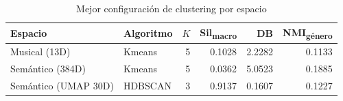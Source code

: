 \begin{table}[htbp]
  \centering
  \caption{Mejor configuración de clustering por espacio}
  \label{tab:clustering_best_configs}
  \begin{tabular}{llrrrr}
    \toprule
    Espacio & Algoritmo & $K$ & Sil\textsubscript{macro} & DB & NMI\textsubscript{género} \\
    \midrule
    Musical (13D) & Kmeans & 5 & 0.1028 & 2.2282 & 0.1133 \\
    Semántico (384D) & Kmeans & 5 & 0.0362 & 5.0523 & 0.1885 \\
    Semántico (UMAP 30D) & HDBSCAN & 3 & 0.9137 & 0.1607 & 0.1227 \\
    \bottomrule
  \end{tabular}
\end{table}
